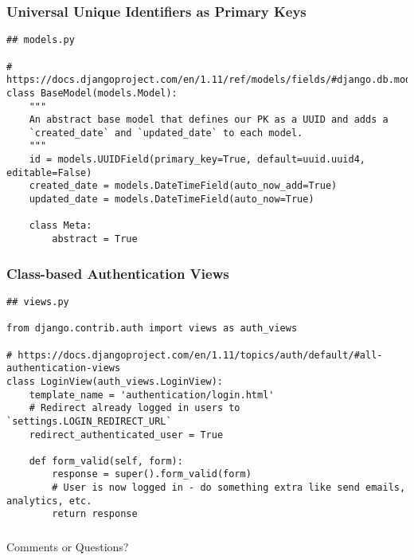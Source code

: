 \documentclass[handout]{beamer}
\begin{document}

\begin{frame}[fragile]
\frametitle{Universal Unique Identifiers as Primary Keys}

{\tiny
\begin{verbatim}
## models.py

# https://docs.djangoproject.com/en/1.11/ref/models/fields/#django.db.models.UUIDField
class BaseModel(models.Model):
    """
    An abstract base model that defines our PK as a UUID and adds a
    `created_date` and `updated_date` to each model.
    """
    id = models.UUIDField(primary_key=True, default=uuid.uuid4, editable=False)
    created_date = models.DateTimeField(auto_now_add=True)
    updated_date = models.DateTimeField(auto_now=True)

    class Meta:
        abstract = True
\end{verbatim}
}

\end{frame}



\begin{frame}[fragile]
\frametitle{Class-based Authentication Views}

{\tiny
\begin{verbatim}
## views.py

from django.contrib.auth import views as auth_views

# https://docs.djangoproject.com/en/1.11/topics/auth/default/#all-authentication-views
class LoginView(auth_views.LoginView):
    template_name = 'authentication/login.html'
    # Redirect already logged in users to `settings.LOGIN_REDIRECT_URL`
    redirect_authenticated_user = True

    def form_valid(self, form):
        response = super().form_valid(form)
        # User is now logged in - do something extra like send emails, analytics, etc.
        return response
\end{verbatim}
}

\end{frame}



\begin{frame}
\frametitle{}
  {\huge Comments or Questions?}
\end{frame}
\end{document}
